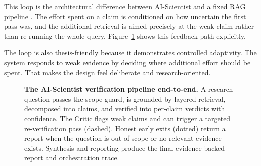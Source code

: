 This loop is the architectural difference between AI-Scientist and a fixed RAG pipeline \cite{lewis2020rag,ragsurvey2024}. The effort spent on a
claim is conditioned on how uncertain the first pass was, and the additional retrieval is aimed precisely at the
weak claim rather than re-running the whole query. Figure~\ref{fig:pipeline} shows this feedback path explicitly.

The loop is also thesis-friendly because it demonstrates controlled adaptivity. The system responds to weak
evidence by deciding where additional effort should be spent. That makes the design feel deliberate and
research-oriented.

\begin{figure}[!htbp]
\centering
{}
\caption[The AI-Scientist verification pipeline]{\textbf{The AI-Scientist verification pipeline end-to-end.} A
research question passes the scope guard, is grounded by layered retrieval, decomposed into claims, and verified
into per-claim verdicts with confidence. The Critic flags weak claims and can trigger a targeted re-verification
pass (dashed). Honest early exits (dotted) return a report when the question is out of scope or no relevant
evidence exists. Synthesis and reporting produce the final evidence-backed report and orchestration trace.}
\label{fig:pipeline}
\end{figure}

